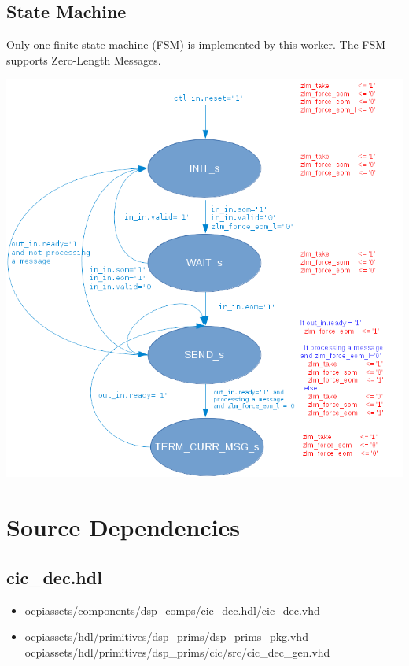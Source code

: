 \documentclass{article}
\def\comp{cic\_dec}
\begin{document}
\subsection*{State Machine}
\begin{flushleft}
	Only one finite-state machine (FSM) is implemented by this worker. The FSM supports Zero-Length Messages.
\end{flushleft}
{\centering\captionsetup{type=figure}\includegraphics[scale=0.45]{cic_decimator_zlm_fsm}
	\label{fig:zlm_fsm}}

\newpage

\section*{Source Dependencies}
\subsection*{\comp.hdl}
\begin{itemize}
	\item ocpiassets/components/dsp\_comps/cic\_dec.hdl/cic\_dec.vhd
	\item ocpiassets/hdl/primitives/dsp\_prims/dsp\_prims\_pkg.vhd
	      \subitem ocpiassets/hdl/primitives/dsp\_prims/cic/src/cic\_dec\_gen.vhd
\end{itemize}
\end{document}
